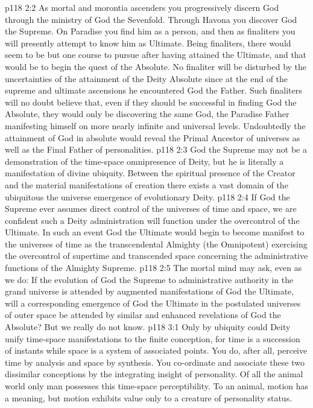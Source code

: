 \pc \vs p118 2:2 As mortal and morontia ascenders you progressively discern God through the ministry of God the Sevenfold. Through Havona you discover God the Supreme. On Paradise you find him as a person, and then as finaliters you will presently attempt to know him as Ultimate. Being finaliters, there would seem to be but one course to pursue after having attained the Ultimate, and that would be to begin the quest of the Absolute. No finaliter will be disturbed by the uncertainties of the attainment of the Deity Absolute since at the end of the supreme and ultimate ascensions he encountered God the Father. Such finaliters will no doubt believe that, even if they should be successful in finding God the Absolute, they would only be discovering the same God, the Paradise Father manifesting himself on more nearly infinite and universal levels. Undoubtedly the attainment of God in absolute would reveal the Primal Ancestor of universes as well as the Final Father of personalities.
\vs p118 2:3 God the Supreme may not be a demonstration of the time\hyp{}space omnipresence of Deity, but he is literally a manifestation of divine ubiquity. Between the spiritual presence of the Creator and the material manifestations of creation there exists a vast domain of the ubiquitous the universe emergence of evolutionary Deity.
\vs p118 2:4 If God the Supreme ever assumes direct control of the universes of time and space, we are confident such a Deity administration will function under the overcontrol of the Ultimate. In such an event God the Ultimate would begin to become manifest to the universes of time as the transcendental Almighty (the Omnipotent) exercising the overcontrol of supertime and transcended space concerning the administrative functions of the Almighty Supreme.
\vs p118 2:5 The mortal mind may ask, even as we do: If the evolution of God the Supreme to administrative authority in the grand universe is attended by augmented manifestations of God the Ultimate, will a corresponding emergence of God the Ultimate in the postulated universes of outer space be attended by similar and enhanced revelations of God the Absolute? But we really do not know.
\vs p118 3:1 Only by ubiquity could Deity unify time\hyp{}space manifestations to the finite conception, for time is a succession of instants while space is a system of associated points. You do, after all, perceive time by analysis and space by synthesis. You co\hyp{}ordinate and associate these two dissimilar conceptions by the integrating insight of personality. Of all the animal world only man possesses this time\hyp{}space perceptibility. To an animal, motion has a meaning, but motion exhibits value only to a creature of personality status.\plusone
